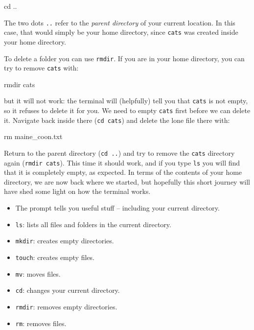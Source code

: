 \documentclass[10pt]{article}
\begin{document}
\begin{cmdline}
cd ..
\end{cmdline}

The two dots \texttt{..} refer to the \textit{parent directory} of your current location. In this case, that would simply be your home directory, since \texttt{cats} was created inside your home directory.

To delete a folder you can use \texttt{rmdir}. If you are in your home directory, you can try to remove \texttt{cats} with:

\begin{cmdline}
rmdir cats
\end{cmdline}

but it will not work: the terminal will (helpfully) tell you that \texttt{cats} is not empty, so it refuses to delete it for you. We need to empty \texttt{cats} first before we can delete it. Navigate back inside there (\texttt{cd cats}) and delete the lone file there with:

\begin{cmdline}
rm maine_coon.txt
\end{cmdline}

Return to the parent directory (\texttt{cd ..}) and try to remove the \texttt{cats} directory again (\texttt{rmdir cats}). This time it should work, and if you type \texttt{ls} you will find that it is completely empty, as expected. In terms of the contents of your home directory, we are now back where we started, but hopefully this short journey will have shed some light on how the terminal works.

\begin{summary}
   \begin{itemize}[leftmargin=0.6cm]
        \item The prompt tells you useful stuff -- including your current directory.
        \item \texttt{ls}: lists all files and folders in the current directory.
        \item \texttt{mkdir}: creates empty directories.
        \item \texttt{touch}: creates empty files.
        \item \texttt{mv}: moves files.
        \item \texttt{cd}: changes your current directory.
        \item \texttt{rmdir}: removes empty directories.
        \item \texttt{rm}: removes files.
    \end{itemize}
\end{summary}
\end{document}
